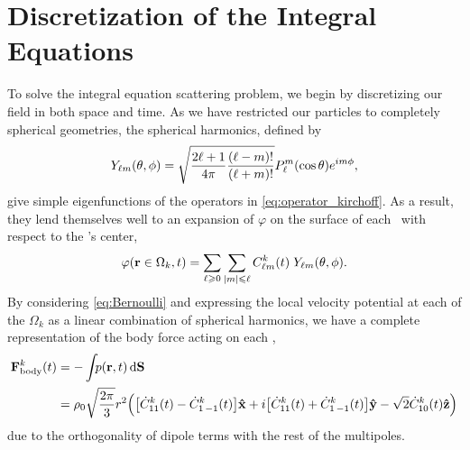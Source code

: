 \section{Discretization of the Integral Equations}

To solve the integral equation scattering problem, we begin by discretizing our field in both space and time.
As we have restricted our particles to completely spherical geometries, the spherical harmonics, defined by
\begin{equation} \label{eq:Ylms}
  Y_{\ell m}\quantity(\theta, \phi) = \sqrt{\frac{2\ell + 1}{4\pi}\frac{\quantity(\ell - m)!}{\quantity(\ell + m)!}}P_\ell^m\quantity(\cos\theta)e^{i m \phi},
\end{equation}
give simple eigenfunctions of the operators in \cref{eq:operator_kirchoff}.
As a result, they lend themselves well to an expansion of $\varphi$ on the surface of each \bubble\ with respect to the \bubble's center,
\begin{equation} \label{eq:potential_expansion}
  \varphi(\vb{r}\in\Omega_k, t) = \sum_{\ell \geqslant 0} \sum_{\abs{m} \leqslant \ell} C^k_{\ell m}(t) \; Y_{\ell m}\qty(\theta, \phi).
\end{equation}
By considering \cref{eq:Bernoulli} and expressing the local velocity potential at each of the $\Omega_k$ as a linear combination of spherical harmonics, we have a complete representation of the body force acting on each \bubble,
\begin{align}
  \vb{F}_\text{body}^k(t) &= - \int_{} p(\vb{r}, t) \dd{\vb{S}} \nonumber \\
  &= \rho_0 \sqrt{\frac{2\pi}{3}}r^2 \Big(\qty[\dot{C}^k_{11}(t) - \dot{C}^k_{1\, -1}(t)]\vu{x} + i\qty[\dot{C}^k_{11}(t) + \dot{C}^k_{1\,-1}(t)]\vu{y} - \sqrt{2}\dot{C}^k_{10}(t)\vu{z}\Big)
\end{align}
due to the orthogonality of dipole terms with the rest of the multipoles.

